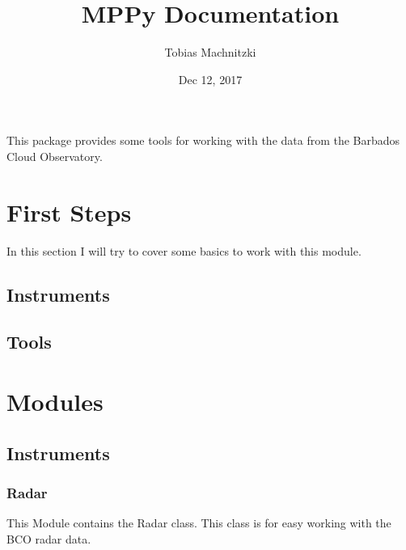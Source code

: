 \documentclass[letterpaper,10pt,english]{sphinxmanual}
\title{MPPy Documentation}
\date{Dec 12, 2017}
\author{Tobias Machnitzki}
\begin{document}
\maketitle
\sphinxtableofcontents
{}\label{\detokenize{index::doc}}


This package provides some tools for working with the data from the Barbados Cloud Observatory.


\chapter{First Steps}
\label{\detokenize{intro:first-steps}}\label{\detokenize{intro:documentation-of-the-mppy-project}}\label{\detokenize{intro::doc}}
In this section I will try to cover some basics to work with this module.


\section{Instruments}
\label{\detokenize{intro:instruments}}

\section{Tools}
\label{\detokenize{intro:tools}}

\chapter{Modules}
\label{\detokenize{modules:modules}}\label{\detokenize{modules::doc}}

\section{Instruments}
\label{\detokenize{modules:instruments}}

\subsection{Radar}
\label{\detokenize{MPPy.Instruments:radar}}\label{\detokenize{MPPy.Instruments:module-MPPy.Instruments.Radar}}\label{\detokenize{MPPy.Instruments::doc}}
This Module contains the Radar class. This class is for easy working with the BCO radar data.
\end{document}
